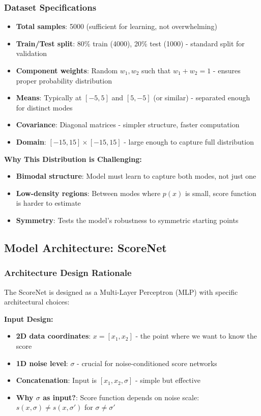 \documentclass[journal]{IEEEtran}
\begin{document}
\subsubsection{Dataset Specifications}

\begin{itemize}
    \item \textbf{Total samples}: 5000 (sufficient for learning, not overwhelming)
    \item \textbf{Train/Test split}: 80\% train (4000), 20\% test (1000) - standard split for validation
    \item \textbf{Component weights}: Random $w_1, w_2$ such that $w_1 + w_2 = 1$ - ensures proper probability distribution
    \item \textbf{Means}: Typically at $[-5, 5]$ and $[5, -5]$ (or similar) - separated enough for distinct modes
    \item \textbf{Covariance}: Diagonal matrices - simpler structure, faster computation
    \item \textbf{Domain}: $[-15, 15] \times [-15, 15]$ - large enough to capture full distribution
\end{itemize}

\textbf{Why This Distribution is Challenging:}
\begin{itemize}
    \item \textbf{Bimodal structure}: Model must learn to capture both modes, not just one
    \item \textbf{Low-density regions}: Between modes where $p(x)$ is small, score function is harder to estimate
    \item \textbf{Symmetry}: Tests the model's robustness to symmetric starting points
\end{itemize}

\subsection{Model Architecture: ScoreNet}

\subsubsection{Architecture Design Rationale}

The ScoreNet is designed as a Multi-Layer Perceptron (MLP) with specific architectural choices:

\textbf{Input Design:}
\begin{itemize}
    \item \textbf{2D data coordinates}: $x = [x_1, x_2]$ - the point where we want to know the score
    \item \textbf{1D noise level}: $\sigma$ - crucial for noise-conditioned score networks
    \item \textbf{Concatenation}: Input is $[x_1, x_2, \sigma]$ - simple but effective
    \item \textbf{Why $\sigma$ as input?}: Score function depends on noise scale: $s(x, \sigma) \neq s(x, \sigma')$ for $\sigma \neq \sigma'$
\end{itemize}
\end{document}

